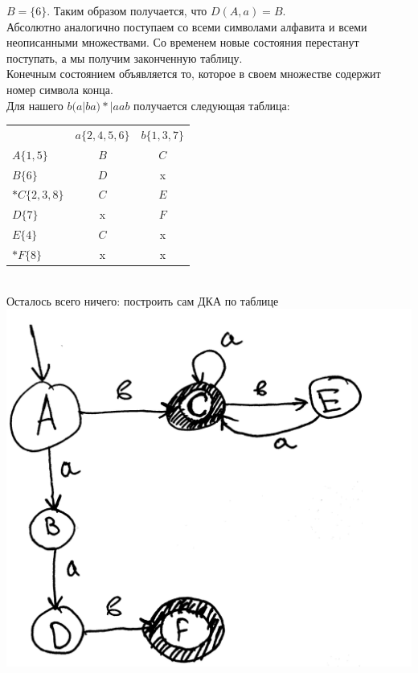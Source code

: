 \documentclass[14pt]{extreport}
\begin{document}
	$B=\{6\}$. Таким образом получается, что $D(A, a) = B$.\\
	Абсолютно аналогично поступаем со всеми символами алфавита и всеми неописанными множествами.
	Со временем новые состояния перестанут поступать, а мы получим законченную таблицу.\\
	Конечным состоянием объявляется то, которое в своем множестве содержит номер символа конца.\\
	\newpage
	Для нашего $b(a|ba)*|aab$ получается следующая таблица:\\
		\begin{tabular}{lcc}
			 & $a\{2, 4, 5, 6\}$ & $b\{1, 3, 7\}$ \\
			 $A\{1, 5\}$ & $B$ & $C$ \\
			 $B\{6\}$ & $D$ & x \\
			 $*C\{2, 3, 8\}$ & $C$ & $E$ \\
			 $D\{7\}$ & x & $F$ \\
			 $E\{4\}$ & $C$ & x \\
			 $*F\{8\}$ & x & x \\
		\end{tabular}\\
	Осталось всего ничего: построить сам ДКА по таблице\\
	\includegraphics[scale=0.11]{data/pic3_3.png}\\
\end{document}
